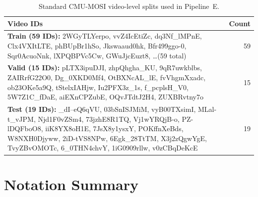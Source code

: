 \documentclass[12pt,a4paper]{article}
\theoremstyle{plain}
\theoremstyle{definition}
\begin{document}
\begin{table}[H]
\centering
\caption{Standard CMU-MOSI video-level splits used in Pipeline~E.}
\label{tab:splits}
\begin{tabular}{p{10cm}r}
\toprule
Video IDs & Count \\
\midrule
\textbf{Train (59 IDs):}
2WGyTLYerpo, vvZ4IcEtiZc, dq3Nf\_lMPnE, Clx4VXItLTE,
phBUpBr1hSo, Jkswaaud0hk, Bfr499ggo-0, Sqr0AcuoNnk,
lXPQBPVc5Cw, GWuJjcEuzt8, \ldots (59 total) & 59 \\
\addlinespace
\textbf{Valid (15 IDs):}
pLTX3ipuDJI, zhpQhgha\_KU, 9qR7uwkblbs, ZAIRrfG22O0,
Dg\_0XKD0Mf4, OtBXNcAL\_lE, fvVhgmXxadc, ob23OKe5a9Q,
tStelxIAHjw, Iu2PFX3z\_1s, f\_pcplsH\_V0, 5W7Z1C\_fDaE,
aiEXnCPZubE, OQvJTdtJ2H4, ZUXBRvtny7o & 15 \\
\addlinespace
\textbf{Test (19 IDs):}
\_dI--eQ6qVU, 03bSnISJMiM, vyB00TXsimI, MLal-t\_vJPM,
Njd1F0vZSm4, 73jzhE8R1TQ, Vj1wYRQjB-o, PZ-lDQFboO8,
iiK8YX8oH1E, 7JsX8y1ysxY, POKffnXeBds, W8NXH0Djyww,
2iD-tVS8NPw, 6Egk\_28TtTM, X3j2zQgwYgE, TvyZBvOMOTc,
6\_0THN4chvY, 1iG0909rllw, v0zCBqDeKcE & 19 \\
\bottomrule
\end{tabular}
\end{table}

\section{Notation Summary}
\label{app:notation}
\end{document}
